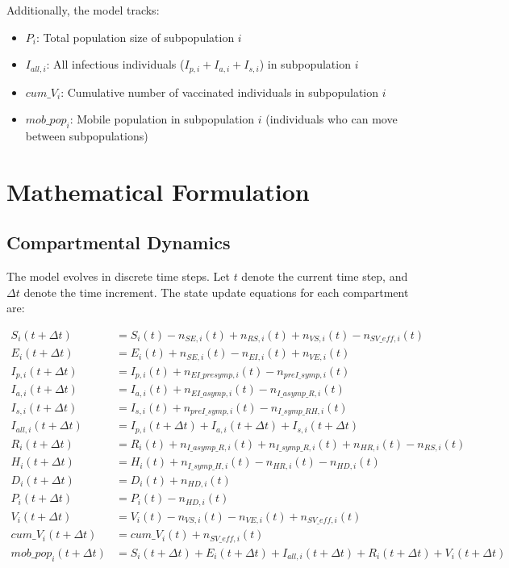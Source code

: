 \documentclass{article}
\begin{document}
Additionally, the model tracks:
\begin{itemize}
    \item $P_i$: Total population size of subpopulation $i$
    \item $I_{all,i}$: All infectious individuals ($I_{p,i} + I_{a,i} + I_{s,i}$) in subpopulation $i$
    \item $cum\_V_i$: Cumulative number of vaccinated individuals in subpopulation $i$
    \item $mob\_pop_i$: Mobile population in subpopulation $i$ (individuals who can move between subpopulations)
\end{itemize}

\section{Mathematical Formulation}

\subsection{Compartmental Dynamics}

The model evolves in discrete time steps. Let $t$ denote the current time step, and $\Delta t$ denote the time increment. The state update equations for each compartment are:

\begin{align}
S_i(t+\Delta t) &= S_i(t) - n_{SE,i}(t) + n_{RS,i}(t) + n_{VS,i}(t) - n_{SV\_eff,i}(t) \\
E_i(t+\Delta t) &= E_i(t) + n_{SE,i}(t) - n_{EI,i}(t) + n_{VE,i}(t) \\
I_{p,i}(t+\Delta t) &= I_{p,i}(t) + n_{EI\_presymp,i}(t) - n_{preI\_symp,i}(t) \\
I_{a,i}(t+\Delta t) &= I_{a,i}(t) + n_{EI\_asymp,i}(t) - n_{I\_asymp\_R,i}(t) \\
I_{s,i}(t+\Delta t) &= I_{s,i}(t) + n_{preI\_symp,i}(t) - n_{I\_symp\_RH,i}(t) \\
I_{all,i}(t+\Delta t) &= I_{p,i}(t+\Delta t) + I_{a,i}(t+\Delta t) + I_{s,i}(t+\Delta t) \\
R_i(t+\Delta t) &= R_i(t) + n_{I\_asymp\_R,i}(t) + n_{I\_symp\_R,i}(t) + n_{HR,i}(t) - n_{RS,i}(t) \\
H_i(t+\Delta t) &= H_i(t) + n_{I\_symp\_H,i}(t) - n_{HR,i}(t) - n_{HD,i}(t) \\
D_i(t+\Delta t) &= D_i(t) + n_{HD,i}(t) \\
P_i(t+\Delta t) &= P_i(t) - n_{HD,i}(t) \\
V_i(t+\Delta t) &= V_i(t) - n_{VS,i}(t) - n_{VE,i}(t) + n_{SV\_eff,i}(t) \\
cum\_V_i(t+\Delta t) &= cum\_V_i(t) + n_{SV\_eff,i}(t) \\
mob\_pop_i(t+\Delta t) &= S_i(t+\Delta t) + E_i(t+\Delta t) + I_{all,i}(t+\Delta t) + R_i(t+\Delta t) + V_i(t+\Delta t)
\end{align}
\end{document}

